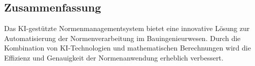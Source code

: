\subsection{Zusammenfassung}
Das KI-gestützte Normenmanagementsystem bietet eine innovative Lösung zur Automatisierung der Normenverarbeitung im Bauingenieurwesen. Durch die Kombination von KI-Technologien und mathematischen Berechnungen wird die Effizienz und Genauigkeit der Normenanwendung erheblich verbessert.
